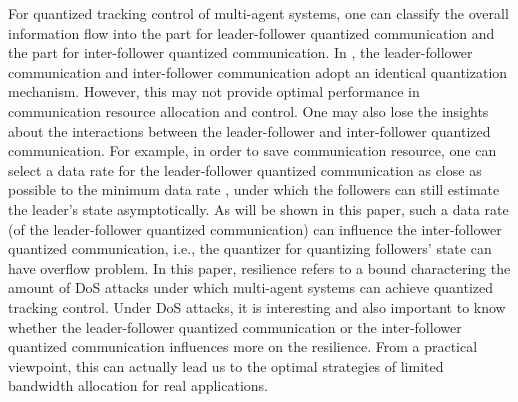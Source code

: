 \documentclass{autart}
\begin{document}
For quantized tracking control of multi-agent systems, one can classify the overall information flow into the part for leader-follower quantized communication and the part for inter-follower quantized communication. In \cite{ran2021practical, feng2020arxiv}, the leader-follower communication and inter-follower communication adopt an identical quantization mechanism. However,  this may not provide optimal performance in communication resource allocation and control. One may also lose the insights about the interactions between the leader-follower and inter-follower quantized communication.
For example, in order to save communication resource, one can select a data rate for the leader-follower quantized communication as close as possible to the minimum data rate \cite{1310461}, under which the followers can still estimate the leader's state asymptotically. As will be shown in this paper, such a data rate (of the leader-follower quantized communication) can influence the inter-follower quantized communication, i.e., the quantizer for quantizing followers' state can have overflow problem. In this paper, resilience refers to a bound charactering the amount of DoS attacks under which multi-agent systems can achieve quantized tracking control.
Under DoS attacks, it is interesting and also important to know whether the leader-follower quantized communication or the inter-follower quantized communication influences more on the resilience. From a practical viewpoint, this can actually lead us to the optimal strategies of limited bandwidth allocation for real applications.   


\end{document}
